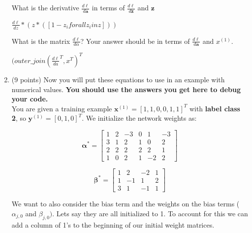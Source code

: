 \documentclass[11pt]{exam}
\numberwithin{equation}{section} %
\numberwithin{figure}{section} %
\numberwithin{table}{section} %
\newcommand{\av}{\mathbf{a}}
\newcommand{\xv}{\mathbf{x}}
\newcommand{\yv}{\mathbf{y}}
\newcommand{\zv}{\mathbf{z}}
\begin{document}
\begin{enumerate}
\begin{questions}
	        
	        
	        
	        \question[3] What is the derivative $\frac{d\ell}{d\av}$ in terms of $\frac{d\ell}{d\zv}$ and $\zv$
	        
	        
	        \begin{tcolorbox}[fit,height=3cm, width=6cm, blank, borderline={1pt}{-2pt}]
			$ \frac{d\ell}{dz} * (z * ([1-z_i for all z_i in z])) $
		\end{tcolorbox}
	        
	        
	        
	        \question[1] What is the matrix $\frac{d\ell}{d\alpha}$? Your answer should be in terms of $\frac{d\ell}{d\av}$ and $x^{(1)}$.
	    
	        \begin{tcolorbox}[fit,height=3cm, width=6cm, blank, borderline={1pt}{-2pt}]
			$(outer\_join(\frac{d\ell}{da}^T, x^T)^T$
	        \end{tcolorbox}
	        
	    \end{questions}
	
	    
	
	\item (9 points) Now you will put these equations to use in an example with numerical values. \textbf{You should use the answers you get here to debug your code.} \\
	You are given a training example $\xv^{(1)}=[1,1,0,0,1,1]^T$ with \textbf{label class 2}, so $\yv^{(1)}=[0,1,0]^T$. We initialize the network weights as:
	\begin{center}
	$$\boldsymbol{\alpha^*}=
	    \begin{bmatrix}
	    1 & 2 & -3 & 0 & 1 & -3 \\
	    3 & 1 & 2 & 1 & 0 & 2 \\
	    2 & 2 & 2 & 2 & 2 & 1 \\
	    1 & 0 & 2 & 1 & -2 & 2
	    \end{bmatrix}$$
	    
	$$\boldsymbol{\beta^*}=
	    \begin{bmatrix}
	    1 & 2 & -2 & 1 \\
	    1 & -1 & 1 & 2 \\
	    3 & 1 & -1 & 1
	    \end{bmatrix}
	$$
	\end{center}
	    
	We want to also consider the bias term and the weights on the bias terms (${\alpha}_{j,0}$ and ${\beta}_{j,0})$. Lets say they are all initialized to 1. To account for this we can add a column of 1's to the beginning of our initial weight matrices. 
	

\end{enumerate}
\end{document}
